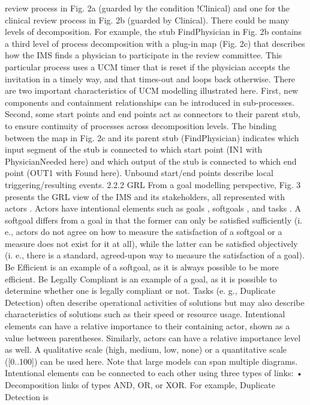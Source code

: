 review process in Fig. 2a (guarded by the condition
!Clinical) and one for the clinical review process in
Fig. 2b (guarded by Clinical).
There could be many levels of decomposition.
For example, the stub FindPhysician in Fig. 2b
contains a third level of process decomposition
with a plug-in map (Fig. 2c) that describes how the
IMS finds a physician to participate in the review
committee. This particular process uses a UCM
timer that is reset if the physician accepts the
invitation in a timely way, and that times-out and
loops back otherwise.
There are two important characteristics of UCM
modelling illustrated here. First, new components
and containment relationships can be introduced in
sub-processes. Second, some start points and end
points act as connectors to their parent stub, to ensure continuity of processes across decomposition
levels. The binding between the map in Fig. 2c
and its parent stub (FindPhysician) indicates which
input segment of the stub is connected to which
start point (IN1 with PhysicianNeeded here) and
which output of the stub is connected to which end
point (OUT1 with Found here). Unbound start/end
points describe local triggering/resulting events.
2.2.2 GRL
From a goal modelling perspective, Fig. 3 presents
the GRL view of the IMS and its stakeholders, all
represented with actors . Actors have intentional elements such as goals , softgoals ,
and tasks . A softgoal differs from a goal in
that the former can only be satisfied sufficiently
(i. e., actors do not agree on how to measure the
satisfaction of a softgoal or a measure does not
exist for it at all), while the latter can be satisfied
objectively (i. e., there is a standard, agreed-upon
way to measure the satisfaction of a goal). Be
Efficient is an example of a softgoal, as it is always
possible to be more efficient. Be Legally Compliant is an example of a goal, as it is possible to
determine whether one is legally compliant or not.
Tasks (e. g., Duplicate Detection) often describe
operational activities of solutions but may also
describe characteristics of solutions such as their
speed or resource usage. Intentional elements
can have a relative importance to their containing actor, shown as a value between parentheses.
Similarly, actors can have a relative importance
level as well. A qualitative scale (high, medium,
low, none) or a quantitative scale ([0..100]) can
be used here. Note that large models can span
multiple diagrams.
Intentional elements can be connected to each
other using three types of links:
• Decomposition links of types AND, OR,
or XOR. For example, Duplicate Detection is
